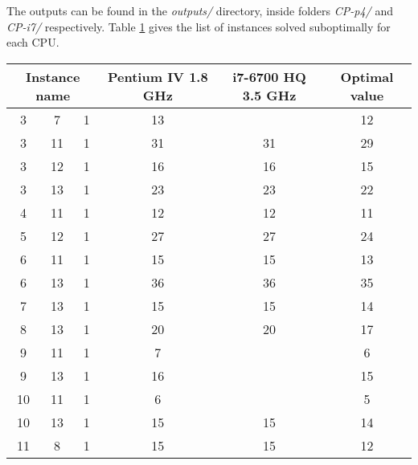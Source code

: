 The outputs can be found in the \textit{outputs/} directory, inside folders
\textit{CP-p4/} and \textit{CP-i7/} respectively. Table \ref{table:CP-results:suboptimalinstances}
gives the list of instances solved suboptimally for each CPU.

\begin{table}[H]
\centering
	\begin{tabular}{cccccc}
		\multicolumn{3}{c}{Instance name}
					& Pentium IV 1.8 GHz	& i7-6700 HQ 3.5 GHz	& Optimal value \\
		\midrule
		3 & 7 & 1	& 13					& 						& 12 \\
		3 & 11 & 1	& 31					& 31					& 29 \\
		3 & 12 & 1	& 16					& 16					& 15 \\
		3 & 13 & 1	& 23					& 23					& 22 \\
		4 & 11 & 1	& 12					& 12					& 11 \\
		5 & 12 & 1	& 27					& 27					& 24 \\
		6 & 11 & 1	& 15					& 15					& 13 \\
		6 & 13 & 1	& 36					& 36					& 35 \\
		7 & 13 & 1	& 15					& 15					& 14 \\
		8 & 13 & 1	& 20					& 20					& 17 \\
		9 & 11 & 1	& 7						&						& 6 \\
		9 & 13 & 1	& 16					&						& 15 \\
		10 & 11 & 1	& 6						&						& 5 \\
		10 & 13 & 1	& 15					& 15					& 14 \\
		11 & 8 & 1	& 15					& 15					& 12 \\
	\end{tabular}
	\label{table:CP-results:suboptimalinstances}
\end{table}
